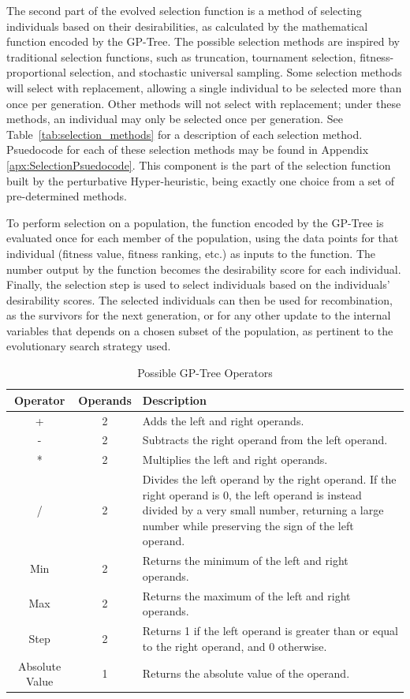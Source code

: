 \documentclass[times,12pt,titlepage]{mstogs}
\begin{document}
\begin{ThesisBody}
The second part of the evolved selection function is a method of selecting individuals based on their desirabilities, as calculated by the mathematical function encoded by the GP-Tree. The possible selection methods are inspired by traditional selection functions, such as truncation, tournament selection, fitness-proportional selection, and stochastic universal sampling. Some selection methods will select with replacement, allowing a single individual to be selected more than once per generation. Other methods will not select with replacement; under these methods, an individual may only be selected once per generation. See Table~\ref{tab:selection_methods} for a description of each selection method. Psuedocode for each of these selection methods may be found in Appendix \ref{apx:SelectionPsuedocode}. This component is the part of the selection function built by the perturbative Hyper-heuristic, being exactly one choice from a set of pre-determined methods.

To perform selection on a population, the function encoded by the GP-Tree is evaluated once for each member of the population, using the data points for that individual (fitness value, fitness ranking, etc.) as inputs to the function. The number output by the function becomes the desirability score for each individual. Finally, the selection step is used to select individuals based on the individuals' desirability scores. The selected individuals can then be used for recombination, as the survivors for the next generation, or for any other update to the internal variables that depends on a chosen subset of the population, as pertinent to the evolutionary search strategy used.

\begin{table}
\centering
  \caption{Possible GP-Tree Operators}
  \label{tab:gp-operators}
  \begin{tabular}{cc|p{9cm}}
    \toprule
    Operator & Operands & Description\\
    \midrule
    + & 2 & Adds the left and right operands. \\
    \hline
    - & 2 & Subtracts the right operand from the left operand.\\    
    \hline
    * & 2 & Multiplies the left and right operands.\\  
    \hline
    / & 2 & Divides the left operand by the right operand. If the right operand is 0, the left operand is instead divided by a very small number, returning a large number while preserving the sign of the left operand.\\      
    \hline
    Min & 2 & Returns the minimum of the left and right operands.\\
    \hline
    Max & 2 & Returns the maximum of the left and right operands.\\
    \hline
    Step & 2 & Returns 1 if the left operand is greater than or equal to the right operand, and 0 otherwise.\\
    \hline
    Absolute Value & 1 & Returns the absolute value of the operand.\\    
	

\end{tabular}
\end{table}
\end{ThesisBody}
\end{document}
